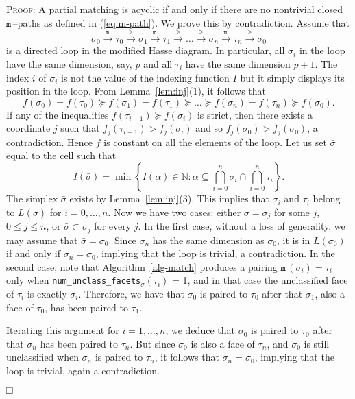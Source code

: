 \documentclass[12pt]{article}
\newenvironment{proof}{\noindent\textsc{Proof: }}{\hfill$\fbox{}$\par\medskip\par}
\newcommand{\N}{{\mathbb N}}
\newcommand{\ma}{\texttt{m}\,} \newcommand{\re}{\texttt{r}\,}
\begin{document}
\begin{proof}
A partial matching is acyclic if and only if there are no nontrivial closed $\ma$--paths as defined in (\ref{eq:m-path}). We prove this by contradiction. Assume that
\begin{equation}\label{eq:directed-loop}
\sigma_0 \xrightarrow{\ma}  \tau_0 \xrightarrow{>} \sigma_1 \xrightarrow{\ma} \tau_1 \xrightarrow{>} \ldots \xrightarrow{>} \sigma_n \xrightarrow{\ma}
\tau_n \xrightarrow{>} \sigma_0
\end{equation}
is a directed loop in the modified Hasse diagram. In particular, all $\sigma_i$ in the loop have the same dimension, say, $p$ and all $\tau_i$ have the same dimension $p+1$.
The index $i$ of $\sigma_i$ is not the value of the indexing function $I$ but it simply displays its position in the loop.
From Lemma~\ref{lem:inj}(1), it follows that
\begin{equation}\label{eq:directed-loop-f}
f(\sigma_0) =  f(\tau_0)  \succeq  f(\sigma_1) = f(\tau_1) \succeq  \ldots \succeq  f(\sigma_n) = f( \tau_n) \succeq f(\sigma_0).
\end{equation}
If any of the inequalities $f(\tau_{i-1})  \succeq  f(\sigma_i)$ is strict, then there exists a coordinate $j$ such that
$f_j(\tau_{i-1}) > f_j(\sigma_i)$ and so $f_j(\sigma_0) > f_j(\sigma_0)$, a contradiction. Hence $f$ is constant on all the elements of the loop.
Let us set $\bar \sigma$ equal to the cell such that $$I(\bar\sigma) =\min\left\{I(\alpha)\in \N: \alpha\subseteq \bigcap_{i=0}^n\sigma_i\cap \bigcap_{i=0}^n\tau_i\right\}.$$
The simplex $\bar\sigma$ exists  by Lemma~\ref{lem:inj}(3). This implies that $\sigma_i$ and $\tau_i $ belong to $L(\bar \sigma)$ for $i=0,\ldots, n$. Now we have two cases: either
$\bar\sigma=\sigma_j$ for some $j$, $0\le j\le n$, or $\bar \sigma \subset \sigma_j$ for every $j$. In the first case, without a loss of generality, we may assume that $\bar\sigma=\sigma_0$.  Since $\sigma_n$ has the same dimension as $\sigma_0$, it is  in $L(\sigma_0)$ if and only if $\sigma_n=\sigma_0$, implying that the loop is trivial, a contradiction.
In the second case, note that Algorithm~\ref{alg-match} produces a pairing $\ma(\sigma_i)=\tau_i$ only when \texttt{{num}\_{unclass}\_{facets}}$_{\bar \sigma} (\tau_i)$ = 1, and in that case the unclassified face of $\tau_i$ is exactly $\sigma_i$. Therefore, we have that $\sigma_0$ is paired to $\tau_0$ after that $\sigma_1$,  also a face of $\tau_0$, has been paired to $\tau_1$.

Iterating this argument for $i=1,\ldots, n$, we deduce that $\sigma_0$ is paired to $\tau_0$ after that $\sigma_n$ has been paired to $\tau_n$. But since $\sigma _0$ is also a face of $\tau_n$, and $\sigma_0$ is still unclassified when $\sigma_n$ is paired to $\tau_n$, it follows that $\sigma_n=\sigma_0$, implying that the loop is trivial, again a contradiction.

\end{proof}
\end{document}
